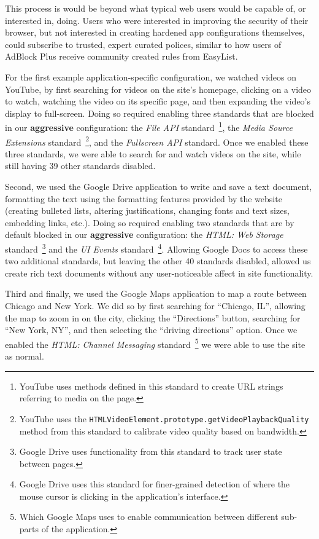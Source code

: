 This process is would be beyond what typical web users would be
capable of, or interested in, doing.  Users who were interested in improving the
security of their browser, but not interested in creating hardened app
configurations themselves, could subscribe to trusted, expert curated polices,
similar to how users of AdBlock Plus receive community created rules from
EasyList.

For the first example application-specific configuration, we watched videos on
YouTube, by first searching for videos on the site's homepage, clicking on a
video to watch, watching the video on its specific page, and then expanding the
video's display to full-screen.  Doing so required enabling three standards
that are blocked in our \textbf{aggressive} configuration: the \textit{File
API} standard~\footnote{YouTube uses methods defined in this standard to create
URL strings referring to media on the page.}, the \textit{Media Source
Extensions} standard~\footnote{YouTube uses the
\texttt{HTMLVideoElement.prototype.getVideoPlaybackQuality} method from this
standard to calibrate video quality based on bandwidth.}, and the
\textit{Fullscreen API} standard. Once we enabled these three standards,
we were able to search for and watch videos on the site, while still
having 39 other standards disabled.

Second, we used the Google Drive application to write and save a text document,
formatting the text using the formatting features provided by the website
(creating bulleted lists, altering justifications, changing fonts and text
sizes, embedding links, etc.).  Doing so required enabling two standards that
are by default blocked in our \textbf{aggressive} configuration: the
\textit{HTML: Web Storage} standard~\footnote{Google Drive uses functionality
from this standard to track user state between pages.} and the \textit{UI
Events} standard~\footnote{Google Drive uses this standard for finer-grained
detection of where the mouse cursor is clicking in the application's
interface.}.  Allowing Google Docs to access these two additional standards,
but leaving the other 40 standards disabled, allowed us create rich text
documents without any user-noticeable affect in site functionality.

Third and finally, we used the Google Maps application to map a route between
Chicago and New York.  We did so by first searching for ``Chicago, IL'',
allowing the map to zoom in on the city, clicking the ``Directions'' button,
searching for ``New York, NY'', and then selecting the ``driving directions''
option.  Once we enabled the \textit{HTML: Channel Messaging}
standard~\footnote{Which Google Maps uses to enable communication between
different sub-parts of the application.} we were able to use the site as
normal.
